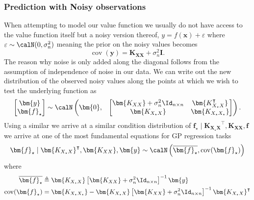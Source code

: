 \subsubsection{Prediction with Noisy observations}\label{Section1.5.2}
When attempting to model our value function we usually do not have access to the value function itself but a noisy version thereof, $y = f(\bm{x}) + \varepsilon$ where $\varepsilon \sim \calN (0, \sigma_n^2)$ meaning the prior on the noisy values becomes
\[
    \operatorname{cov} (\bm{y}) = \bm{K_{XX}} + \sigma_n^2 \bm{I}.
\]
The reason why noise is only added along the diagonal follows from the assumption of independence of noise in our data.
We can write out the new distribution of the observed noisy values along the points at which we wish to test the underlying function as
\[
    \begin{bmatrix}
        \bm{y} \\
        \bm{f}_{\star}
    \end{bmatrix}
    \sim \calN
    \begin{pmatrix}
        \bm{0}, &
        {
                \begin{bmatrix}
                    \bm{K_{XX}} + \sigma_n^2 \Id_{n \times n} & \bm{K_{X_{\star}X}^{\intercal}} \\
                    \bm{K_{X_{\star}X}}                       & \bm{K_{X_{\star}X_{\star}}}
                \end{bmatrix}
            }
    \end{pmatrix}.
\]
Using a similar we arrive at a similar condition distribution of $\bm{f}_{\star} \mid \bm{K_{X_{\star}X}}^{\intercal} , \bm{K_{XX}}, \bm{f}$ we arrive at one of the most fundamental equations for GP regression tasks
\begin{equation}\label{prop:GP_train_distr2}
    \bm{f}_{\star} \mid \bm{K_{X_{\star}X}}^{\intercal} , \bm{K_{XX}}, \bm{y} \sim \calN \left( \overline{\bm{f}_{\star}}, \operatorname{cov} (\bm{f}_{\star}) \right)
\end{equation}
where
\begin{align}
    \overline{\bm{f}_{\star}}           & \triangleq \bm{K_{X_{\star} X}} \left[ \bm{K_{XX}} + \sigma_n^2 \Id_{n \times n} \right]^{-1} \bm{y} \label{eq: GP_train_distr2_mean}                                             \\
    \operatorname{cov} (\bm{f}_{\star}) & = \bm{K_{X_{\star}X_{\star}}} - \bm{K_{X_{\star}X}} \left[ \bm{K_{XX}} + \sigma_n^2 \Id_{n \times n} \right]^{-1} \bm{K_{X_{\star}X}}^{\intercal} \label{eq: GP_train_distr2_var}
\end{align}
